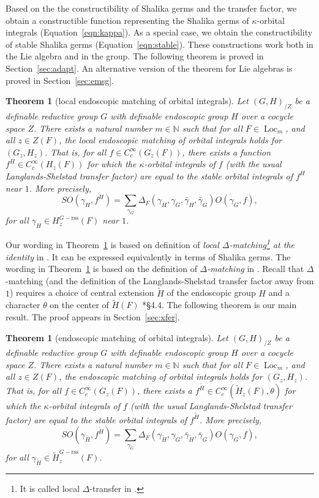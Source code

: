 \documentclass[12pt]{amsart}
\newcommand{\op}[1]{\operatorname{#1}}
\newcommand{\ring}[1]{{\mathbb #1}}
\newcommand{\reg}{\mathrm{rss}}
\theoremstyle{plain}
\newtheorem{theorem}[thm]{Theorem}
\theoremstyle{definition}
\begin{document}
Based on the the constructibility of Shalika germs and the transfer
factor, we obtain a constructible function representing the Shalika
germs of $\kappa$-orbital integrals (Equation~\ref{eqn:kappa}).  As a
special case, we obtain the constructibility of stable Shalika germs
(Equation~\ref{eqn:stable}).  These constructions work both in the Lie
algebra and in the group.  The following theorem is proved in
Section~\ref{sec:adapt}.  An alternative version of the theorem for
Lie algebras is proved in Section~\ref{sec:emsg}.

\begin{theorem}[local endoscopic matching of orbital integrals]\label{thm:local}
  Let $(G,H)_{/Z}$ be a definable reductive group $G$ with definable
  endoscopic group $H$ over a cocycle space $Z$.  There exists a
  natural number $m\in \ring{N}$ such that for all $F\in
  \op{Loc}_{m}$, and all $z\in Z(F)$, the local endoscopic matching of
  orbital integrals holds for $(G_z,H_z)$.  That is, for all $f\in
  C_c^\infty(G_z(F))$, there exists a function $f^H\in C_c^\infty(H_z(F))$ for
  which the $\kappa$-orbital integrals of $f$ (with the usual
  Langlands-Shelstad transfer factor) are equal to the stable orbital
  integrals of $f^H$ near $1$. More precisely,
\[
SO(\gamma_H,f^H) = \sum_{\gamma_G} \Delta_F(\gamma_H,\gamma_G,\bar
\gamma_H,\bar \gamma_G) O(\gamma_G,f),
\]
for all $\gamma_H\in H^{G-\reg}_z(F)$ near $1$.
\end{theorem}

Our wording in Theorem~\ref{thm:local} is based on definition of {\it
  local $\Delta$-matching\footnote{It is called local $\Delta$-transfer in
    \cite{LSd}.} at the identity} in \cite{LSd}.  It can be
expressed equivalently in terms of Shalika germs.  The wording in
Theorem~\ref{thm:xfer} is based on the definition of {\it
  $\Delta$-matching} in \cite{LSd}.  Recall that $\Delta$-matching
(and the definition of the Langlands-Shelstad transfer factor away
from $1$) requires a choice of central extension $\tilde H$ of the
endoscopic group $H$ and a character $\theta$ on the center of
$\tilde H(F)$ \cite{LSxf}*{\S 4.4}.  The following theorem  is our main
result.  The proof appears in Section~\ref{sec:xfer}.

\begin{theorem}[endoscopic matching of orbital integrals]\label{thm:xfer}
  Let $(G,H)_{/Z}$ be a definable reductive group $G$ with definable
  endoscopic group $H$ over a cocycle space $Z$.  There exists a
  natural number $m\in \ring{N}$ such that for all $F\in
  \op{Loc}_{m}$, and all $z\in Z(F)$, the endoscopic matching of
  orbital integrals holds for $(G_z,H_z)$.  That is, for all $f\in
  C_c^\infty(G_z(F))$, there exists a $f^{\tilde H}\in
  C_c^\infty(\tilde H_z(F),\theta)$ for which the $\kappa$-orbital
  integrals of $f$ (with the usual Langlands-Shelstad transfer factor)
  are equal to the stable orbital integrals of $f^{\tilde H}$. More
  precisely,
\[
SO(\gamma_{\tilde H},f^{\tilde H}) = \sum_{\gamma_G}
\Delta_F(\gamma_{\tilde H},\gamma_G,\bar
\gamma_{\tilde H},\bar \gamma_G) O(\gamma_G,f),
\]
for all $\gamma_{\tilde H}\in {\tilde H}^{G-\reg}_z(F)$.
\end{theorem}
\end{document}
